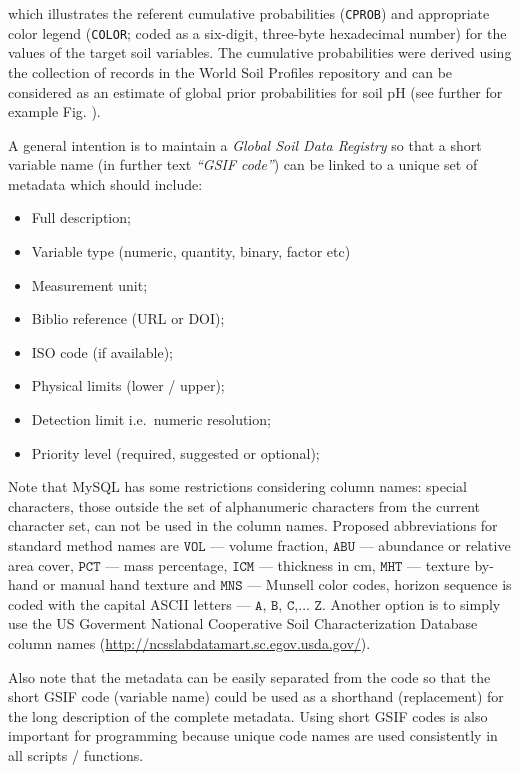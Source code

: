 \documentclass[11pt]{krantz}
\theoremstyle{definition}
\theoremstyle{definition}
\theoremstyle{definition}
\theoremstyle{remark}
\begin{document}
which illustrates the referent cumulative probabilities (\texttt{CPROB})
and appropriate color legend (\texttt{COLOR}; coded as a six-digit,
three-byte hexadecimal number) for the values of the target soil
variables. The cumulative probabilities were derived using the
collection of records in the World Soil Profiles repository and can be
considered as an estimate of global prior probabilities for soil pH (see
further for example Fig. ).

A general intention is to maintain a \emph{Global Soil Data Registry} so
that a short variable name (in further text \emph{``GSIF code''}) can be
linked to a unique set of metadata which should include:

\begin{itemize}
\item
  Full description;
\item
  Variable type (numeric, quantity, binary, factor etc)
\item
  Measurement unit;
\item
  Biblio reference (URL or DOI);
\item
  ISO code (if available);
\item
  Physical limits (lower / upper);
\item
  Detection limit i.e.~numeric resolution;
\item
  Priority level (required, suggested or optional);
\end{itemize}

Note that MySQL has some restrictions considering column names: special
characters, those outside the set of alphanumeric characters from the
current character set, can not be used in the column names. Proposed
abbreviations for standard method names are \(\mathtt{VOL}\) --- volume
fraction, \(\mathtt{ABU}\) --- abundance or relative area cover,
\(\mathtt{PCT}\) --- mass percentage, \(\mathtt{ICM}\) --- thickness in
cm, \(\mathtt{MHT}\) --- texture by-hand or manual hand texture and
\(\mathtt{MNS}\) --- Munsell color codes, horizon sequence is coded with
the capital ASCII letters --- \(\mathtt{A}\), \(\mathtt{B}\),
\(\mathtt{C}\),\(\ldots\) \(\mathtt{Z}\). Another option is to simply
use the US Goverment National Cooperative Soil Characterization Database
column names (\url{http://ncsslabdatamart.sc.egov.usda.gov/}).

Also note that the metadata can be easily separated from the code so
that the short GSIF code (variable name) could be used as a shorthand
(replacement) for the long description of the complete metadata. Using
short GSIF codes is also important for programming because unique code
names are used consistently in all scripts / functions.
\end{document}
